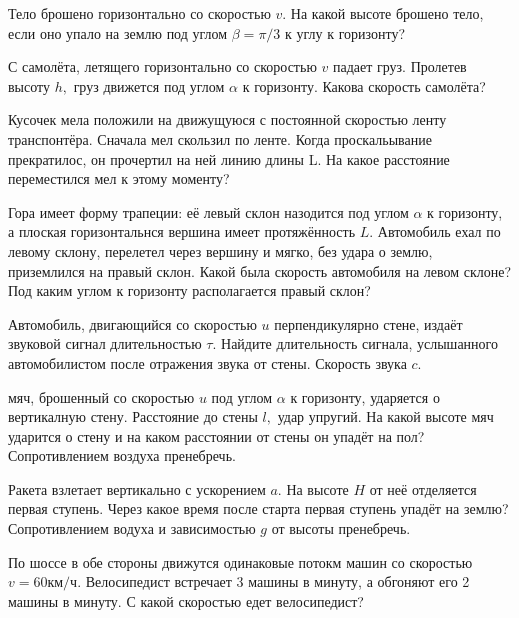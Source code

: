 \begin{task}
Тело брошено горизонтально со скоростью $v.$ На какой высоте брошено тело, если оно
упало на землю под углом $\beta = \pi/3$ к углу к горизонту?
\label{task:k-98-1-1}
\end{task}
\begin{task}
С самолёта, летящего горизонтально со скоростью $v$ падает груз. Пролетев высоту $h,$ груз движется
под углом $\alpha$ к горизонту. Какова скорость самолёта?
\label{task:k-98-1-2}
\end{task}
\begin{task}
Кусочек мела положили на движущуюся с постоянной скоростью ленту транспонтёра. Сначала мел скользил по ленте.
Когда проскальывание прекратилос, он прочертил на ней линию длины L. На какое расстояние переместился мел к этому
моменту?
\label{task:k-06-1}
\end{task}
\begin{task}
Гора имеет форму трапеции: её левый склон назодится под углом $\alpha$ к горизонту, а плоская горизонтальнся вершина
имеет протяжённость $L.$ Автомобиль ехал по левому склону, перелетел через вершину и мягко, без удара о
землю, приземлился на правый склон. Какой была скорость автомобиля на левом склоне? Под каким углом к горизонту
располагается правый склон?
\label{task:k-06-2}
\end{task}
\begin{task}
Автомобиль, двигающийся со скоростью $u$ перпендикулярно стене, издаёт звуковой сигнал
длительностью $\tau.$ Найдите длительность сигнала, услышанного автомобилистом
после отражения звука от стены. Скорость звука $c.$
\label{task:k-07-1-8}
\end{task}
\begin{task}
мяч, брошенный со скоростью $u$ под углом $\alpha$ к горизонту, ударяется о вертикалную стену.
Расстояние до стены $l,$ удар упругий. На какой высоте мяч ударится о стену и на каком расстоянии от
стены он упадёт на пол? Сопротивлением воздуха пренебречь.
\label{task:k-07-4-8}
\end{task}
\begin{task}
Ракета взлетает вертикально с ускорением $a.$ На высоте $H$ от неё отделяется первая ступень.
Через какое время после старта первая ступень упадёт на землю? Сопротивлением водуха и зависимостью
$g$ от высоты пренебречь.
\label{task:k-07-1-9}
\end{task}
\begin{task}
По шоссе в обе стороны движутся одинаковые потокм машин со скоростью $v=60\text{км/ч}.$
Велосипедист встречает 3 машины в минуту, а обгоняют его 2 машины в минуту. С какой скоростью
едет велосипедист?
\label{task:k-08-1-9}
\end{task}

